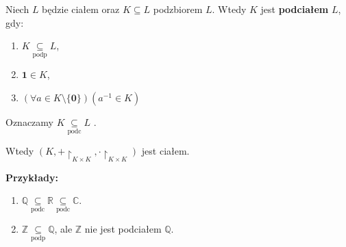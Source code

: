 
\begin{definition}[Podciało.]
	Niech $L$ będzie ciałem oraz $K\subseteq L$ podzbiorem $L$. Wtedy $K$ jest \textbf{podciałem} $L$, gdy:
	\begin{enumerate}[label=\arabic*)]
		\item $K\underset{\scriptscriptstyle\text{podp}}{\subseteq} L$,
		\item $\mathbf{1} \in K$,
		\item $\left(\forall a \in K\setminus \{\mathbf{0}\}  \right) \left( a^{-1}\in K \right) $
	\end{enumerate}
\noindent Oznaczamy $K\underset{\scriptscriptstyle\text{podc}}{\subseteq} L$ .
\end{definition} 
\begin{remark}
	Wtedy $\left( K, +\restriction_{\scriptscriptstyle K\times K}, \cdot\restriction_{\scriptscriptstyle K\times K} \right) $ jest ciałem.
\end{remark} 
\noindent \textbf{Przykłady:}
\begin{enumerate}[label=\arabic*)]
	\item $\mathbb{Q} \underset{\scriptscriptstyle\text{podc}}{\subseteq} \mathbb{R} \underset{\scriptscriptstyle\text{podc}}{\subseteq} \mathbb{C} $.
	\item $\mathbb{Z} \underset{\scriptscriptstyle\text{podp}}{\subseteq} \mathbb{Q} $, ale  $\mathbb{Z} $ nie jest podciałem $\mathbb{Q} $.
\end{enumerate}
